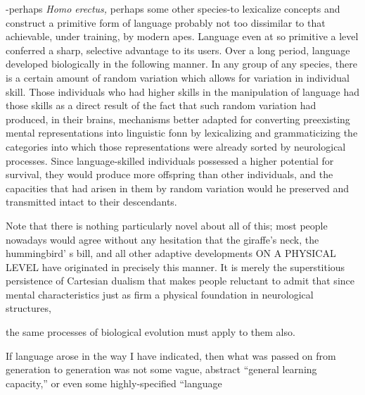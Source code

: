 {}-perhaps \textit{Homo} \textit{erectus,} perhaps some other species{}-to lexicalize concepts and construct a primitive form of language probably not too dissimilar to that achievable, under training, by modern apes. Language even at so primitive a level conferred a sharp, selective advantage to its users. Over a long period, language developed biologically in the follow\-ing manner. In any group of any species, there is a certain amount of random variation which allows for variation in individual skill. Those individuals who had higher skills in the manipulation of language had those skills as a direct result of the fact that such random variation had produced, in their brains, mechanisms better adapted for converting preexisting mental representations into linguistic fonn by lexicalizing and grammaticizing the categories into which those representations were already sorted by neurological processes. Since language-skilled individuals possessed a higher potential for survival, they would pro\-duce more offspring than other individuals, and the capacities that had arisen in them by random variation would he preserved and trans\-mitted intact to their descendants.

Note that there is nothing particularly novel about all of this; most people nowadays would agree without any hesitation that the giraffe's neck, the hummingbird' s bill, and all other adaptive develop\-ments ON A PHYSICAL LEVEL have originated in precisely this manner. It is merely the superstitious persistence of Cartesian dualism that makes people reluctant to admit that since mental characteristics just as firm a physical foundation in neurological structures,

the same processes of biological evolution must apply to them also.

If language arose in the way I have indicated, then what was passed on from generation to generation was not some vague, abstract ``general learning capacity,'' or even some highly-specified ``language


